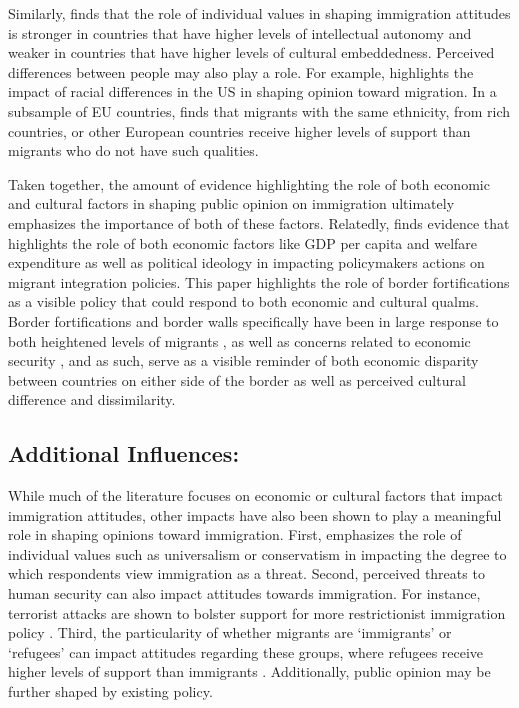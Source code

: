 \documentclass[12pt,]{article}
\begin{document}
Similarly, \citet{davidov2020} finds that the role of individual values
in shaping immigration attitudes is stronger in countries that have
higher levels of intellectual autonomy and weaker in countries that have
higher levels of cultural embeddedness. Perceived differences between
people may also play a role. For example, \citet{ayers2009} highlights
the impact of racial differences in the US in shaping opinion toward
migration. In a subsample of EU countries, \citet{deconinck2020} finds
that migrants with the same ethnicity, from rich countries, or other
European countries receive higher levels of support than migrants who do
not have such qualities.

Taken together, the amount of evidence highlighting the role of both
economic and cultural factors in shaping public opinion on immigration
ultimately emphasizes the importance of both of these factors.
Relatedly, \citet{solano2023} finds evidence that highlights the role of
both economic factors like GDP per capita and welfare expenditure as
well as political ideology in impacting policymakers actions on migrant
integration policies. This paper highlights the role of border
fortifications as a visible policy that could respond to both economic
and cultural qualms. Border fortifications and border walls specifically
have been in large response to both heightened levels of migrants
\citep{avdan2023}, as well as concerns related to economic security
\citep{carter2017}, and as such, serve as a visible reminder of both
economic disparity between countries on either side of the border as
well as perceived cultural difference and dissimilarity.

\subsection{Additional Influences:}\label{additional-influences}

While much of the literature focuses on economic or cultural factors
that impact immigration attitudes, other impacts have also been shown to
play a meaningful role in shaping opinions toward immigration. First,
\citet{davidov2020} emphasizes the role of individual values such as
universalism or conservatism in impacting the degree to which
respondents view immigration as a threat. Second, perceived threats to
human security can also impact attitudes towards immigration. For
instance, terrorist attacks are shown to bolster support for more
restrictionist immigration policy \citep{young2018}. Third, the
particularity of whether migrants are `immigrants' or `refugees' can
impact attitudes regarding these groups, where refugees receive higher
levels of support than immigrants \citep{deconinck2020}. Additionally,
public opinion may be further shaped by existing policy.
\end{document}
